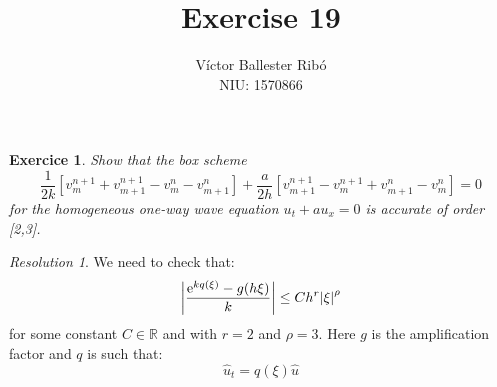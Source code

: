 \documentclass[10pt,a4paper]{article}
\title{\bfseries\Large Exercise 19}
\author{Víctor Ballester Ribó\\NIU: 1570866}
\date{\parbox{\linewidth}{\centering
  Integració numèrica d'equacions en derivades parcials\endgraf
  Grau en Matemàtiques\endgraf
  Universitat Autònoma de Barcelona\endgraf
  Febrer de 2023}}
\newcommand{\RR}{\ensuremath{\mathbb{R}}} %
\newtheorem{exercici}{Exercice}
\theoremstyle{definition}
\theoremstyle{remark}
\newtheorem*{res}{Resolution}
\renewcommand{\exp}[1]{\mathrm{e}^{#1}} %
\begin{document}
\maketitle
\begin{exercici}
  Show that the box scheme
  \begin{equation}\label{eq:scheme}
    \frac{1}{2k}\left[v_m^{n+1}+v_{m+1}^{n+1}-v_m^n-v_{m+1}^n\right] +\frac{a}{2h}\left[v_{m+1}^{n+1}-v_m^{n+1}+v_{m+1}^n-v_m^n\right]=0
  \end{equation}
  for the homogeneous one-way wave equation $u_t+au_x=0$ is accurate of order [2,3].
\end{exercici}
\begin{res}
  We need to check that:
  \begin{equation}
    \abs{\frac{\exp{kq(\xi)}-g(h\xi)}{k}}\leq C h^r\abs{\xi}^\rho
  \end{equation}
  for some constant $C\in\RR$ and with $r=2$ and $\rho=3$. Here $g$ is the amplification factor and $q$ is such that:
  $$
    \widehat{u}_t=q(\xi)\widehat{u}
  $$


\end{res}
\end{document}
